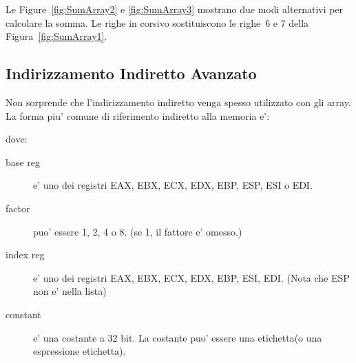Le Figure~\ref{fig:SumArray2} e \ref{fig:SumArray3} mostrano due modi
alternativi per calcolare la somma. Le righe in corsivo sostituiscono
le righe~6 e 7 della Figura~\ref{fig:SumArray1}.

\subsection{Indirizzamento Indiretto Avanzato}

Non sorprende che l'indirizzamento indiretto venga spesso utilizzato con 
gli array. La forma piu' comune di riferimento indiretto alla memoria e':
\begin{center}
{}
\end{center}
dove:
\begin{description}
\item[base reg] e' uno dei registri EAX, EBX, ECX, EDX, EBP, ESP, ESI
                o EDI.
\item[factor] puo' essere 1, 2, 4 o 8. (se 1, il fattore e' omesso.)
\item[index reg] e' uno dei registri EAX, EBX, ECX, EDX, EBP, ESI, EDI.
                 (Nota che ESP non e' nella lista)
\item[constant] e' una costante a 32 bit. La costante puo' essere una etichetta(o
                una espressione etichetta).
\end{description}

